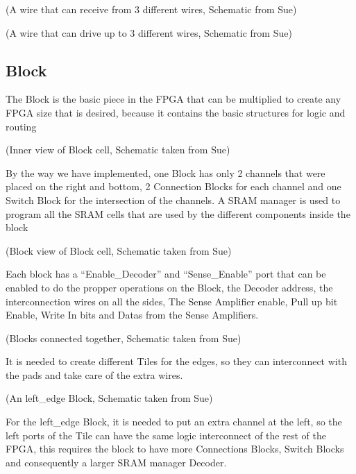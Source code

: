 \documentclass[letterpaper,10pt,english]{sphinxmanual}
\begin{document}
\noindent{}

(A wire that can receive from 3 different wires, Schematic from Sue)

\noindent{}

(A wire that can drive up to 3 different wires, Schematic from Sue)


\subsection{Block}
\label{block::doc}\label{block:block}
The Block is the basic piece in the FPGA that can be multiplied to create any FPGA size that is desired, because it contains the basic structures for logic and routing

\noindent{}

(Inner view of Block cell, Schematic taken from Sue)

By the way we have implemented, one Block has only 2 channels that were placed on the right and bottom, 2 Connection Blocks for each channel and one Switch Block for the intersection of the channels. A SRAM manager is used to program all the SRAM cells that are used by the different components inside the block

\noindent{}

(Block view of Block cell, Schematic taken from Sue)

Each block has a ``Enable\_Decoder'' and ``Sense\_Enable'' port that can be enabled to do the propper operations on the Block, the Decoder address, the interconnection wires on all the sides, The Sense Amplifier enable, Pull up bit Enable, Write In bits and Datas from the Sense Amplifiers.

\noindent{}

(Blocks connected together, Schematic taken from Sue)

It is needed to create different Tiles for the edges, so they can interconnect with the pads and take care of the extra wires.

\noindent{}

(An left\_edge Block, Schematic taken from Sue)

For the left\_edge Block, it is needed to put an extra channel at the left, so the left ports of the Tile can have the same logic interconnect of the rest of the FPGA, this requires the block to have more Connections Blocks, Switch Blocks and consequently a larger SRAM manager Decoder.
\end{document}
